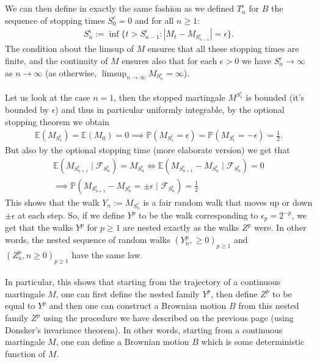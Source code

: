 \documentclass[../mainfile.tex]{subfiles}
\begin{document}
\\\\
We can then define in exactly the same fashion as we defined $T_n^\epsilon$ for $B$ the sequence of stopping times $S_0^\epsilon =0$ and for all $n \geq 1$:
\begin{align*}
S_n^\epsilon:= \inf \{ t > S_{n-1}^\epsilon : |M_t-M_{S_{n-1}^\epsilon}|= \epsilon\}. 
\end{align*}
The condition about the limsup of $M$ ensures that all these stopping times are finite, and the continuity of $M$ ensures also that for each $\epsilon >0$ we have $S_n^\epsilon \to \infty$ as $n \to \infty$ (as otherwise, $\limsup_{n \to \infty} M_{S_n^\epsilon} = \infty$). 
\\
\\
Let us look at the case $n=1$, then the stopped martingale $M^{S_1^\epsilon}$ is bounded (it's bounded by $\epsilon$) and thus in particular uniformly integrable, by the optional stopping theorem we obtain 
\begin{align*}
\mathbb{E}(M_{S_1^\epsilon}) = \mathbb{E}(M_0)=0 \implies \mathbb{P}(M_{S_1^\epsilon}= \epsilon)= \mathbb{P}( M_{S_1^\epsilon}= - \epsilon)= \frac{1}{2}.
\end{align*}
But also by the optional stopping time (more elaborate version) we get that 
\begin{align*}
\mathbb{E}(M_{S_{n+1}^\epsilon} \mid \mathcal{F}_{S_n^\epsilon}) = M_{S_n^\epsilon} \iff \mathbb{E}(M_{S_{n+1}^\epsilon}-M_{S_n^\epsilon} \mid \mathcal{F}_{S_n^\epsilon}) =0 
\\
\implies \mathbb{P}(M_{S_{n+1}^\epsilon}-M_{S_n^\epsilon} = \pm \epsilon \mid \mathcal{F}_{S_n^\epsilon}) = \frac{1}{2}
\end{align*}
This shows that the walk $Y_n:= M_{S_n^\epsilon}$ is a fair random walk that moves up or down $\pm \epsilon$ at each step. So, if we define $Y^p$ to be the walk corresponding to $\epsilon_p = 2^{-p}$, we get that the walks $Y^p$ for $p \geq 1$ are nested exactly as the walks $Z^p$ were. In other words,  the nested sequence of random walks $(Y_n^p, \geq 0 )_{p \geq 1}$ and $(Z_n^p, n \geq 0 )_{p \geq 1}$ have the same law. 
\\\\
In particular, this shows that starting from the trajectory of a continuous martingale $M$, one can first define the nested family $Y^p$, then define $Z^p$ to be equal to $Y^p$ and then one can construct a Brownian motion $B$ from this nested family $Z^p$ using the procedure we have described on the previous page (using Donsker's invariance theorem). In other words, starting from a continuous martingale $M$, one can define a Brownian motion $B$ which is some deterministic function of $M$. 
\end{document}
